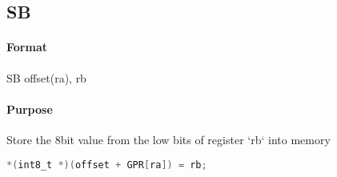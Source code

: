 \subsection{SB}


\paragraph{Format} SB offset(ra), rb

\paragraph{Purpose} Store the 8bit value from the low bits of register `rb` into memory

\begin{lstlisting}[language=C]
    *(int8_t *)(offset + GPR[ra]) = rb;
\end{lstlisting}